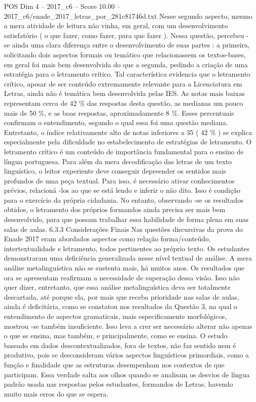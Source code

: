 \begin{textsample}{POS Dim 4 – 2017\_c6 – Score 10.00 – 2017\_c6/enade\_2017\_letras\_por\_281c81746d.txt}
Nesse segundo aspecto, mesmo a mera atividade de leitura não vinha, em geral, com um desenvolvimento satisfatório ( o que fazer, como fazer, para que fazer ).
Nessa questão, percebeu -se ainda uma clara diferença entre o desenvolvimento de suas partes : a primeira, solicitando dois aspectos formais ou temático que relacionassem os textos-bases, em geral foi mais bem desenvolvida do que a segunda, pedindo a criação de uma estratégia para o letramento crítico.
Tal característica evidencia que o letramento crítico, apesar de ser conteúdo extremamente relevante para a Licenciatura em Letras, ainda não é temática bem desenvolvida pelas IES.
As notas mais baixas representam cerca de 42 \% das respostas desta questão, as medianas um pouco mais de 50 \%, e as boas respostas, aproximadamente 8 \%.
Esses percentuais confirmam o entendimento, segundo o qual essa foi uma questão mediana.
Entretanto, o índice relativamente alto de notas inferiores a 35 ( 42 \% ) se explica especialmente pela dificuldade no estabelecimento de estratégias de letramento.
O letramento crítico é um conteúdo de importância fundamental para o ensino de língua portuguesa.
Para além da mera decodificação das letras de um texto linguístico, o leitor experiente deve conseguir depreender os sentidos mais profundos de uma peça textual.
Para isso, é necessário ativar conhecimentos prévios, relacioná -los ao que se está lendo e inferir o não dito.
Isso é condição para o exercício da própria cidadania.
No entanto, observando -se os resultados obtidos, o letramento dos próprios formandos ainda precisa ser mais bem desenvolvido, para que possam trabalhar essa habilidade de forma plena em suas salas de aulas. 6.3.3 Considerações Finais Nas questões discursivas da prova do Enade 2017 eram abordados aspectos como relação forma/conteúdo, intertextualidade e letramento, todos pertinentes ao próprio texto.
Os estudantes demonstraram uma deficiência generalizada nesse nível textual de análise.
A mera análise metalinguística não se sustenta mais, há muitos anos.
Os resultados que ora se apresentam reafirmam a necessidade de superação dessa visão.
Isso não quer dizer, entretanto, que essa análise metalinguística deva ser totalmente descartada, até porque ela, por mais que receba prioridade nas salas de aulas, ainda é deficitária, como se constatou nos resultados da Questão 3, na qual o entendimento de aspectos gramaticais, mais especificamente morfológicos, mostrou -se também insuficiente.
Isso leva a crer ser necessário alterar não apenas o que se ensina, mas também, e principalmente, como se ensina.
O estudo baseado em dados descontextualizados, fora de textos, não faz sentido nem é produtivo, pois se desconsideram vários aspectos linguísticos primordiais, como a função e finalidade que as estruturas desempenham nos contextos de que participam.
Essa verdade salta aos olhos quando se analisam os desvios de língua padrão usada nas respostas pelos estudantes, formandos de Letras, havendo muito mais erros do que se espera.

\end{textsample}
